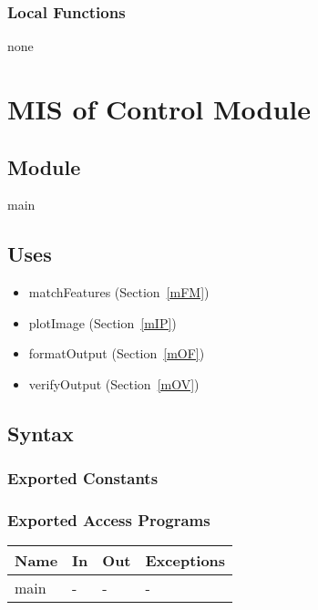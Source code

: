 \documentclass[12pt, titlepage]{article}
\begin{document}
\subsubsection{Local Functions}
none


\section{MIS of Control Module} \label{mC}



\subsection{Module}

main

\subsection{Uses}
\begin{itemize}
  \item matchFeatures (Section~\ref{mFM})
  \item plotImage (Section~\ref{mIP})
  \item formatOutput (Section~\ref{mOF})
  \item verifyOutput (Section~\ref{mOV})
\end{itemize}

\subsection{Syntax}

\subsubsection{Exported Constants}

\subsubsection{Exported Access Programs}

\begin{center}
\begin{tabular}{p{2cm} p{4cm} p{4cm} p{2cm}}
\hline
\textbf{Name} & \textbf{In} & \textbf{Out} & \textbf{Exceptions} \\
\hline
main & - & - & - \\
\hline
\end{tabular}
\end{center}
\end{document}
